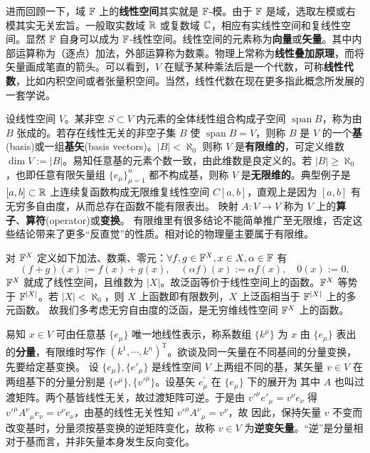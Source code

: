进而回顾一下，域 $\mathbb{F}$ 上的\textbf{线性空间}其实就是 $\mathbb{F}$-模。由于 $\mathbb{F}$ 是域，选取左模或右模其实无关宏旨。一般取实数域 $\mathbb{R}$ 或复数域 $\mathbb{C}$，相应有实线性空间和复线性空间。显然 $\mathbb{F}$ 自身可以成为 $\mathbb{F}$-线性空间。线性空间的元素称为\textbf{向量}或\textbf{矢量}。其中内部运算称为（逐点）加法，外部运算称为数乘。物理上常称为\textbf{线性叠加原理}，而将矢量画成笔直的箭头。可以看到，$V$ 在赋予某种乘法后是一个代数，可称\textbf{线性代数}，比如内积空间或者张量积空间。当然，线性代数在现在更多指此概念所发展的一套学说。

设线性空间 $V$。某非空 $S\subset V$ 内元素的全体线性组合构成子空间 $\operatorname{span}B$，称为由 $B$ 张成的。若存在线性无关的非空子集 $B$ 使 $\operatorname{span}B=V$，则称 $B$ 是 $V$ 的一个\textbf{基}(basis)或一组\textbf{基矢}(basis vectors)。$|B|<\aleph_0$ 则称 $V$ 是\textbf{有限维的}，可定义维数 $\dim V:=|B|$。易知任意基的元素个数一致，由此维数是良定义的。若 $|B|\geqslant \aleph_0$，也即任意有限矢量组 $\{e_\mu\}_{\mu=1}^n$ 都不构成基，则称 $V$ 是\textbf{无限维的}。典型例子是 $[a, b] \subset \mathbb{R}$ 上连续复函数构成无限维复线性空间 $C[a, b]$，直观上是因为 $[a, b]$ 有无穷多自由度，从而总存在函数不能有限表出。
映射 $A:V\to V$ 称为 $V$ 上的\textbf{算子}、\textbf{算符}(operator)或\textbf{变换}。
有限维里有很多结论不能简单推广至无限维，否定这些结论带来了更多“反直觉”的性质。相对论的物理量主要属于有限维。

对 $\mathbb{F}^X$ 定义如下加法、数乘、零元：$\forall f,g\in \mathbb{F}^X,x\in X,\alpha\in\mathbb{F}$ 有
\[(f+g)(x):=f(x)+g(x),\quad (\alpha f)(x):=\alpha f(x),\quad 0(x):=0,\]
$\mathbb{F}^X$ 就成了线性空间，且维数为 $|X|$。故泛函等价于线性空间上的函数。$\mathbb{F}^X$ 等势于 $\mathbb{F}^{|X|}$。若 $|X|<\aleph_0$，则 $X$ 上函数即有限数列，$X$ 上泛函相当于 $\mathbb{F}^{|X|}$ 上的多元函数。
故我们多考虑无穷自由度的泛函，是无穷维线性空间 $\mathbb{F}^X$ 上的函数。

易知 $x\in V$ 可由任意基 $\{e_\mu\}$ 唯一地线性表示，称系数组 $\{k^\mu\}$ 为 $x$ 由 $\{e_\mu\}$ 表出的\textbf{分量}，有限维时写作 $(k^1,\cdots,k^n)^\mathrm{T}$。欲谈及同一矢量在不同基间的分量变换，先要给定基变换。
设 $\{e_\mu\},\{e'_\mu\}$ 是线性空间 $V$ 上两组不同的基，某矢量 $v\in V$ 在两组基下的分量分别是 $\{v^\mu\},\{v'^\mu\}$。设基矢 $e_\mu^{\prime}$ 在 $\{e_\mu\}$ 下的展开为
其中 $A$ 也叫过渡矩阵。两个基皆线性无关，故过渡矩阵可逆。于是由 $v'^\mu e'_\mu=v^\nu e_\nu$ 得 $v'^\mu A^\nu{ }_\mu e_\nu=v^\nu e_\nu$，由基的线性无关性知 $v'^\mu A^\nu{ }_\mu =v^\nu$，故
因此，保持矢量 $v$ 不变而改变基时，分量须按基变换的逆矩阵变化，故称 $v\in V$ 为\textbf{逆变矢量}。“逆”是分量相对于基而言，并非矢量本身发生反向变化。

